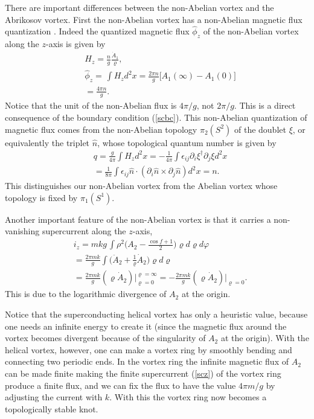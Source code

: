\documentclass[twocolumn,showpacs,showkeys]{revtex4}
\newcommand{\bea}{\begin{eqnarray}}
\newcommand{\eea}{\end{eqnarray}}
\newcommand{\dfrac}{\displaystyle\frac}
\newcommand{\nn}{\nonumber}
\newcommand{\hn}{\hat n}
\begin{document}
There are important differences between the non-Abelian vortex 
and the Abrikosov vortex. First the non-Abelian vortex
has a non-Abelian magnetic flux quantization \cite{cm2}. 
Indeed the quantized magnetic flux $\hat \phi_z$ 
of the non-Abelian vortex along the $z$-axis is given by 
\bea
&H_z= \dfrac{n}{g} \dfrac{\dot A_1}{\varrho}, \nn\\
&\hat \phi_z = \dfrac{}{} \int H_z d^2x
= \dfrac{2\pi n}{g} \big[A_1(\infty) - A_1(0)\big] \nn\\
&= \dfrac{4\pi n}{g}.
\label{zflux}
\eea
Notice that the unit of the non-Abelian flux is $4\pi/g$,
not $2\pi/g$. This is a direct
consequence of the boundary condition (\ref{scbc}).
This non-Abelian quantization of magnetic flux comes
from the non-Abelian topology $\pi_2(S^2)$ of the doublet $\xi$,
or equivalently the triplet $\hn$, whose topological
quantum number is given by \cite{cm2}
\bea
&q = \dfrac {g}{4\pi } \int H_z d^2 x
= - \dfrac {1}{4\pi} \int \epsilon_{ij} \partial_i \xi^{\dagger}
\partial_j \xi d^2 x \nn\\
&= \dfrac {1}{8\pi} \int \epsilon_{ij} \hn \cdot (\partial_i \hn
\times \partial_j \hn) d^2 x = n.
\label{scqn}
\eea
This distinguishes our non-Abelian vortex from
the Abelian vortex whose topology is fixed by $\pi_1(S^1)$.

Another important feature of the non-Abelian vortex 
is that it carries a non-vanishing supercurrent
along the $z$-axis,
\bea
&i_z = mkg \dfrac{}{} \int \rho^2 \big(A_2
-\dfrac{\cos f +1}{2}\big)\varrho d\varrho d\varphi \nn\\
&= \dfrac{2\pi mk}{g} \int \big(\ddot A_2
+\dfrac{1}{\varrho} \dot A_2 \big) \varrho d\varrho \nn\\
&= \dfrac{2\pi mk}{g} (\varrho \dot A_2) \Big|_{\varrho=0}^{\varrho=\infty}
=-\dfrac{2\pi mk}{g} (\varrho \dot A_2) \Big|_{\varrho=0}.
\label{scz}
\eea
This is due to the logarithmic divergence of $A_2$ at the origin.

Notice that the superconducting helical vortex
has only a heuristic value, because one needs
an infinite energy to create it (since the magnetic flux
around the vortex becomes divergent because of the singularity
of $A_2$ at the origin).
With the helical vortex, however, one can make
a vortex ring by smoothly bending and connecting
two periodic ends. In the vortex ring the infinite magnetic
flux of $A_2$ can be made finite making the finite supercurrent
(\ref{scz}) of the vortex ring produce a finite flux,
and we can fix the flux to have the value $4\pi m/g$
by adjusting the current with
$k$. With this the vortex ring now
becomes a topologically stable knot.
\end{document}
